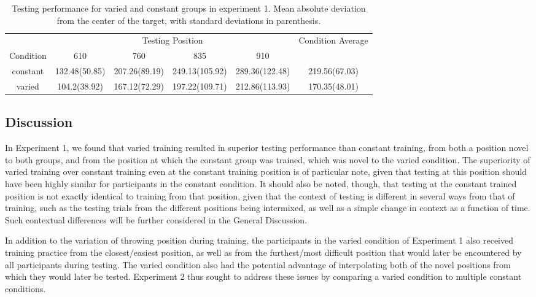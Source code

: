 \documentclass[
  man,floatsintext]{apa7}
\begin{document}
\begin{table}

\caption{\label{tab:e1Table}Testing performance for varied and constant groups in experiment 1. Mean absolute deviation from the center of the target, with standard deviations in parenthesis.}
\centering
\begin{tabular}[t]{c|c|c|c|c|c}
\hline
\multicolumn{1}{c|}{} & \multicolumn{4}{c|}{Testing Position} & \multicolumn{1}{c}{Condition Average} \\
\cline{2-5} \cline{6-6}
Condition & 610 & 760 & 835 & 910 & \\
\hline
constant & 132.48(50.85) & 207.26(89.19) & 249.13(105.92) & 289.36(122.48) & 219.56(67.03)\\
\hline
varied & 104.2(38.92) & 167.12(72.29) & 197.22(109.71) & 212.86(113.93) & 170.35(48.01)\\
\hline
\end{tabular}
\end{table}

\hypertarget{discussion}{%
\subsection{Discussion}\label{discussion}}

In Experiment 1, we found that varied training resulted in superior testing performance than constant training, from both a position novel to both groups, and from the position at which the constant group was trained, which was novel to the varied condition. The superiority of varied training over constant training even at the constant training position is of particular note, given that testing at this position should have been highly similar for participants in the constant condition. It should also be noted, though, that testing at the constant trained position is not exactly identical to training from that position, given that the context of testing is different in several ways from that of training, such as the testing trials from the different positions being intermixed, as well as a simple change in context as a function of time. Such contextual differences will be further considered in the General Discussion.

In addition to the variation of throwing position during training, the participants in the varied condition of Experiment 1 also received training practice from the closest/easiest position, as well as from the furthest/most difficult position that would later be encountered by all participants during testing. The varied condition also had the potential advantage of interpolating both of the novel positions from which they would later be tested. Experiment 2 thus sought to address these issues by comparing a varied condition to multiple constant conditions.
\end{document}
